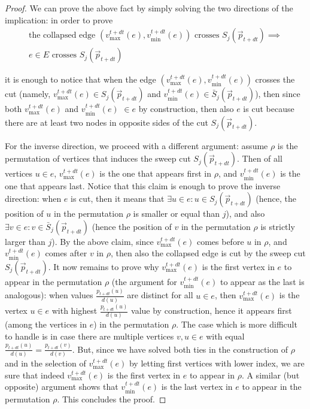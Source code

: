\documentclass[../main.tex]{subfiles}
\begin{document}
\begin{proof}
    
    We can prove the above fact by simply solving the two directions of the implication: in order to prove 
    \begin{multline}
        \text{the collapsed edge } (v_{\text{max}}^{t+dt}(e), v_{\text{min}}^{t+dt}(e)) \text{ crosses } S_j(\vec{p}_{t+dt}) \implies \\ e \in E \text{ crosses } S_j(\vec{p}_{t+dt})
    \end{multline}
    
    it is enough to notice that when the edge $(v_{\text{max}}^{t+dt}(e), v_{\text{min}}^{t+dt}(e))$ crosses the cut (namely, $v_{\text{max}}^{t+dt}(e)\in S_j(\vec{p}_{t+dt})$ and $v_{\text{min}}^{t+dt}(e) \in \bar{S}_j(\vec{p}_{t+dt})$), then since both $v_{\text{max}}^{t+dt}(e)$ and $v_{\text{min}}^{t+dt}(e)$ $\in e$ by construction, then also $e$ is cut because there are at least two nodes in opposite sides of the cut $S_j(\vec{p}_{t+dt})$.
    
    For the inverse direction, we proceed with a different argument: assume $\rho$ is the permutation of vertices that induces the sweep cut $S_j(\vec{p}_{t+dt})$. Then of all vertices $u\in e$, $v_{\text{max}}^{t+dt}(e)$ is the one that appears first in $\rho$, and $v_{\text{min}}^{t+dt}(e)$ is the one that appears last. Notice that this claim is enough to prove the inverse direction: when $e$ is cut, then it means that $\exists u\in e: u\in S_j(\vec{p}_{t+dt})$ (hence, the position of $u$ in the permutation $\rho$ is smaller or equal than $j$), and also $\exists v\in e: v\in \bar{S}_j(\vec{p}_{t+dt})$ (hence the position of $v$ in the permutation $\rho$ is strictly larger than $j$). By the above claim, since $v_{\text{max}}^{t+dt}(e)$ comes before $u$ in $\rho$, and $v_{\text{min}}^{t+dt}(e)$ comes after $v$ in $\rho$, then also the collapsed edge is cut by the sweep cut $S_j(\vec{p}_{t+dt})$. 
    It now remains to prove why $v_{\text{max}}^{t+dt}(e)$ is the first vertex in $e$ to appear in the permutation $\rho$ (the argument for $v_{\text{min}}^{t+dt}(e)$ to appear as the last is analogous): when values $\frac{p_{t+dt}(u)}{d(u)}$ are distinct for all $u\in e$, then $v_{\text{max}}^{t+dt}(e)$ is the vertex $u\in e$ with highest $\frac{p_{t+dt}(u)}{d(u)}$ value by construction, hence it appears first (among the vertices in $e$) in the permutation $\rho$. The case which is more difficult to handle is in case there are multiple vertices $v,u \in e$ with equal $\frac{p_{t+dt}(u)}{d(u)} = \frac{p_{t+dt}(v)}{d(v)}$. But, since we have solved both ties in the construction of $\rho$ and in the selection of $v_{\text{max}}^{t+dt}(e)$ by letting first vertices with lower index, we are sure that indeed $v_{\text{max}}^{t+dt}(e)$ is the first vertex in $e$ to appear in $\rho$. A similar (but opposite) argument shows that $v_{\text{min}}^{t+dt}(e)$ is the last vertex in $e$ to appear in the permutation $\rho$. This concludes the proof.

\end{proof}
\end{document}
